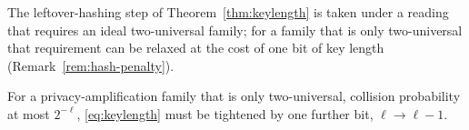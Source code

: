 
The leftover-hashing step of Theorem~\ref{thm:keylength} is taken under a
reading that requires an ideal two-universal family; for a family that is only two-universal that
requirement can be relaxed at the cost of one bit of key length
\cite[Rem.~6.1]{tupkary2026decoy} (Remark~\ref{rem:hash-penalty}).

\begin{requirement}\label{req:hash-penalty}
For a privacy-amplification family that is only two-universal, collision
probability at most $2^{-\ell}$, \eqref{eq:keylength} must be tightened by
one further bit, $\ell\to\ell-1$.
\end{requirement}
